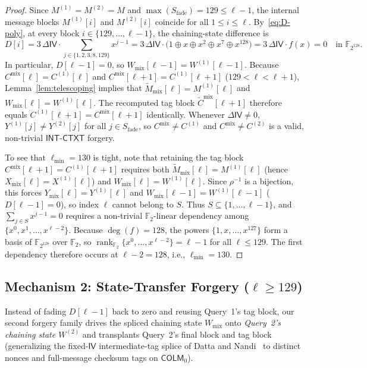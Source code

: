 \documentclass[11pt,a4paper]{article}
\theoremstyle{definition}
\theoremstyle{remark}
\newcommand{\Ftwo}{\mathbb{F}_2}
\newcommand{\FtwoN}{\mathbb{F}_{2^{128}}}
\newcommand{\COLMzero}{\mathsf{COLM}_0}
\newcommand{\IV}{\mathsf{IV}}
\newcommand{\rank}{\operatorname{rank}}
\begin{document}
\begin{proof}
Since $M^{(1)} = M^{(2)} = M$ and $\max(S_{\mathrm{fade}}) = 129 \le \ell - 1$, the internal message blocks $M^{(1)}[i]$ and $M^{(2)}[i]$ coincide for all $1 \le i \le \ell$. By~\eqref{eq:D-poly}, at every block $i \in \{129, \dots, \ell - 1\}$, the chaining-state difference is
\begin{equation}
D[i] = 3 \, \Delta\IV \cdot \sum_{j \in \{1, 2, 3, 8, 129\}} x^{j-1} = 3 \, \Delta\IV \cdot \big(1 \oplus x \oplus x^2 \oplus x^7 \oplus x^{128}\big) = 3 \, \Delta\IV \cdot f(x) = 0 \quad \text{in } \FtwoN.
\end{equation}
In particular, $D[\ell - 1] = 0$, so $W_{\mathrm{mix}}[\ell - 1] = W^{(1)}[\ell - 1]$. Because $C^{\mathrm{mix}}[\ell] = C^{(1)}[\ell]$ and $C^{\mathrm{mix}}[\ell + 1] = C^{(1)}[\ell + 1]$ ($129 < \ell < \ell + 1$), Lemma~\ref{lem:telescoping} implies that $\tilde{M}_{\mathrm{mix}}[\ell] = M^{(1)}[\ell]$ and $W_{\mathrm{mix}}[\ell] = W^{(1)}[\ell]$. The recomputed tag block $\tilde{C}^{\mathrm{mix}}[\ell + 1]$ therefore equals $C^{(1)}[\ell + 1] = C^{\mathrm{mix}}[\ell + 1]$ identically. Whenever $\Delta\IV \neq 0$, $Y^{(1)}[j] \neq Y^{(2)}[j]$ for all $j \in S_{\mathrm{fade}}$, so $C^{\mathrm{mix}} \neq C^{(1)}$ and $C^{\mathrm{mix}} \neq C^{(2)}$ is a valid, non-trivial $\mathsf{INT\text{-}CTXT}$ forgery.

To see that $\ell_{\min} = 130$ is tight, note that retaining the tag block $C^{\mathrm{mix}}[\ell+1] = C^{(1)}[\ell+1]$ requires both $\tilde{M}_{\mathrm{mix}}[\ell] = M^{(1)}[\ell]$ (hence $X_{\mathrm{mix}}[\ell] = X^{(1)}[\ell]$) and $W_{\mathrm{mix}}[\ell] = W^{(1)}[\ell]$. Since $\rho^{-1}$ is a bijection, this forces $Y_{\mathrm{mix}}[\ell] = Y^{(1)}[\ell]$ and $W_{\mathrm{mix}}[\ell-1] = W^{(1)}[\ell-1]$ ($D[\ell-1] = 0$), so index $\ell$ cannot belong to $S$. Thus $S \subseteq \{1, \dots, \ell - 1\}$, and $\sum_{j \in S} x^{j-1} = 0$ requires a non-trivial $\Ftwo$-linear dependency among $\{x^0, x^1, \dots, x^{\ell-2}\}$. Because $\deg(f) = 128$, the powers $\{1, x, \dots, x^{127}\}$ form a basis of $\FtwoN$ over $\Ftwo$, so $\rank_{\Ftwo}\{x^0, \dots, x^{\ell-2}\} = \ell - 1$ for all $\ell \le 129$. The first dependency therefore occurs at $\ell - 2 = 128$, i.e., $\ell_{\min} = 130$.
\end{proof}

\subsection{Mechanism 2: State-Transfer Forgery (\texorpdfstring{$\ell \ge 129$}{l >= 129})}
Instead of fading $D[\ell-1]$ back to zero and reusing Query~1's tag block, our second forgery family drives the spliced chaining state $W_{\mathrm{mix}}$ onto \emph{Query~2's chaining state $W^{(2)}$} and transplants Query~2's final block and tag block (generalizing the fixed-$\IV$ intermediate-tag splice of Datta and Nandi~\cite[Section~5.2]{DN14} to distinct nonces and full-message checksum tags on $\COLMzero$).
\end{document}
